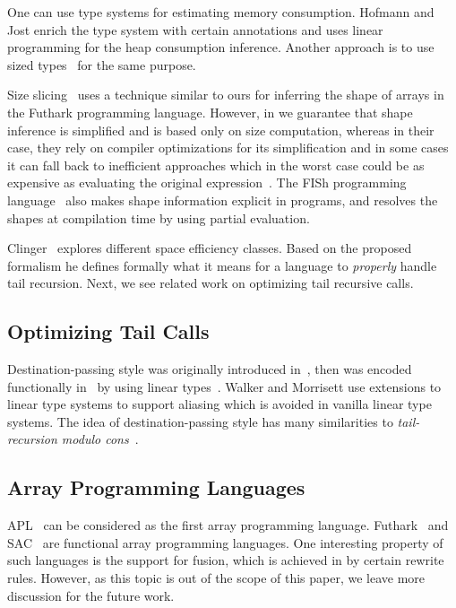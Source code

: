 One can use type systems for estimating memory consumption. Hofmann and Jost \cite{Hofmann:2003:SPH:604131.604148} enrich the type system with certain annotations and uses linear programming for the heap consumption inference. Another approach is to use sized types~\cite{vasconcelos2008space} for the same purpose.

Size slicing~\cite{Henriksen:2014:SSH:2636228.2636238} uses a technique similar to ours for inferring the shape of arrays in the Futhark programming language. However, in \lafsharp{} we guarantee that shape inference is simplified and is based only on size computation, whereas in their case, they rely on compiler optimizations for its simplification and in some cases it can fall back to inefficient approaches which in the worst case could be as expensive as evaluating the original expression~\cite{Hofmann:2003:SPH:604131.604148}. The FISh programming language~\cite{jay1999programming} also makes shape information explicit in programs, and resolves the shapes at compilation time by using partial evaluation.

Clinger~\cite{Clinger98propertail} explores different space efficiency classes. Based on the proposed formalism he defines formally what it means for a language to \textit{properly} handle tail recursion. Next, we see related work on optimizing tail recursive calls.

\subsection{Optimizing Tail Calls}
Destination-passing style was originally introduced in~\cite{larus1989restructuring}, then was encoded functionally in~\cite{Research98afunctional} by using linear types~\cite{turner1995once, wadler1990linear}. Walker and Morrisett \cite{walker2000alias} use extensions to linear type systems to support aliasing which is avoided in vanilla linear type systems. The idea of destination-passing style has many similarities to \textit{tail-recursion modulo cons}~\cite{friedman1975unwinding, wadler1984listlessness}.

\subsection{Array Programming Languages}
APL~\cite{iverson1962programming} can be considered as the first array programming language. Futhark~\cite{Henriksen:2014:SSH:2636228.2636238, Henriksen:2014:BCI:2627373.2627388} and SAC~\cite{Grelck2006} are functional array programming languages. One interesting property of such languages is the support for fusion, which is achieved in \lafsharp{} by certain rewrite rules. However, as this topic is out of the scope of this paper, we leave more discussion for the future work.

